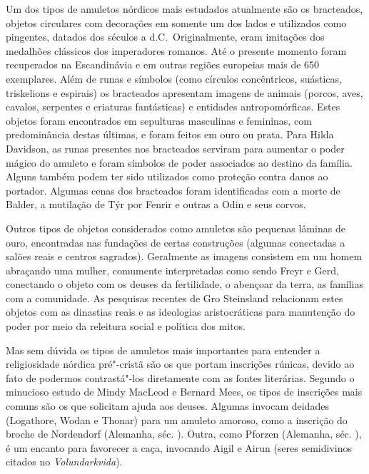 Um dos tipos de amuletos nórdicos mais estudados atualmente são os
bracteados, objetos circulares com decorações em somente um dos lados e
utilizados como pingentes, datados dos séculos  a  
d.C.~Originalmente, eram imitações dos medalhões clássicos dos imperadores
romanos. Até o presente momento foram recuperados na Escandinávia e em
outras regiões europeias mais de 650 exemplares. Além de runas e
símbolos (como círculos concêntricos, suásticas, triskelions e espirais)
os bracteados apresentam imagens de animais (porcos, aves, cavalos,
serpentes e criaturas fantásticas) e entidades antropomórficas. Estes
objetos foram encontrados em sepulturas masculinas e femininas, com
predominância destas últimas, e foram feitos em ouro ou prata. Para
Hilda Davidson, as runas presentes nos bracteados serviram para aumentar
o poder mágico do amuleto e foram símbolos de poder associados ao
destino da família. Alguns também podem ter sido utilizados como
proteção contra danos ao portador. Algumas cenas dos bracteados foram
identificadas com a morte de Balder, a mutilação de Týr por Fenrir e
outras a Odin e seus corvos.

Outros tipos de objetos considerados como amuletos são pequenas lâminas
de ouro, encontradas nas fundações de certas construções (algumas
conectadas a salões reais e centros sagrados). Geralmente as imagens
consistem em um homem abraçando uma mulher, comumente interpretadas como
sendo Freyr e Gerd, conectando o objeto com os deuses da fertilidade, o
abençoar da terra, as famílias com a comunidade. As pesquisas recentes
de Gro Steinsland relacionam estes objetos com as dinastias reais e as
ideologias aristocráticas para manutenção do poder por meio da releitura
social e política dos mitos.

Mas sem dúvida os tipos de amuletos mais importantes para entender a
religiosidade nórdica pré"-cristã são os que portam inscrições rúnicas,
devido ao fato de podermos contrastá"-los diretamente com as fontes
literárias. Segundo o minucioso estudo de Mindy MacLeod e Bernard Mees,
os tipos de inscrições mais comuns são os que solicitam ajuda aos
deuses. Algumas invocam deidades (Logathore, Wodan e Thonar) para um
amuleto amoroso, como a inscrição do broche de Nordendorf (Alemanha,
séc. ). Outra, como Pforzen (Alemanha, séc. ), é um encanto para
favorecer a caça, invocando Aigil e Airun (seres semidivinos citados no
\emph{Volundarkvida}).

